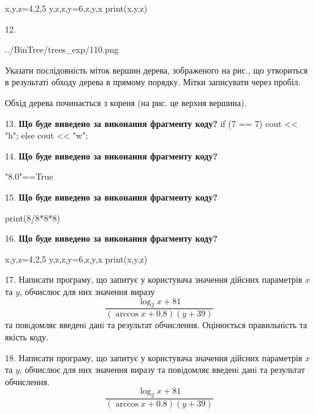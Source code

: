\documentclass[11pt]{article}
\begin{document}
x,y,z=4,2,5
y,z,z,y=6,z,y,x
print(x,y,z)
\par\vspace{5mm}

12. 

\begin{center}
	{../BinTree/trees_exp/110.png}
\end{center}
Указати послідовність міток вершин дерева, зображеного на рис., що утвориться в результаті обходу дерева в прямому порядку. Мітки записувати через пробіл.\par Обхід дерева починається з кореня (на рис. це верхня вершина).
\par\vspace{5mm}

13. \textbf{Що буде виведено за виконання фрагменту коду?}
if (7 == 7)
    cout << "h";
else
    cout << "w";

\par\vspace{5mm}

14. \textbf{Що буде виведено за виконання фрагменту коду?}

"8.0"==True
\par\vspace{5mm}

15. \textbf{Що буде виведено за виконання фрагменту коду?}

print(8/8*8*8)
\par\vspace{5mm}

16. \textbf{Що буде виведено за виконання фрагменту коду?}

x,y,z=4,2,5
y,z,z,y=6,z,y,x
print(x,y,z)
\par\vspace{5mm}

17. 
Написати програму, що запитує у користувача значення дійсних параметрів $x$ та $y$, обчислює для них значення виразу 
$$\frac{\log_{2} x + 81}{(\arccos x + 0.8) (y + 39)}$$ 
та повiдомляє введенi данi та результат обчислення.
 Оцінюється правильність та якість коду.

\par\vspace{5mm}

18. 
Написати програму, що запитує у користувача значення дійсних параметрів $x$ та $y$, обчислює для них значення виразу та повiдомляє введенi данi та результат обчислення.
$$\frac{\log_{2} x + 81}{(\arccos x + 0.8) (y + 39)}$$ 
\end{document}

